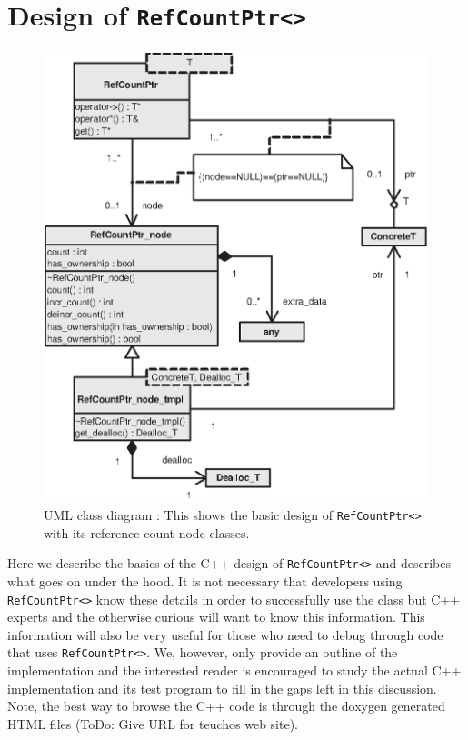 %
\section{Design of \texttt{Ref\-Count\-Ptr<>}}
\label{rcp:apdx:design}
%

{\bsinglespace
\begin{figure}
\begin{center}
\includegraphics*[bb= 0.0in 0.0in 4.5in 5.3in,scale=1.0
]{RefCountPtrClassDiagram}
\end{center}
{}\caption{ {}\label{rcp:fig:rcp-class-diagram} UML class diagram :
This shows the basic design of {}\texttt{Ref\-Count\-Ptr<>} with its
reference-count node classes.  }
\end{figure}
\esinglespace}

Here we describe the basics of the C++ design of
{}\texttt{Ref\-Count\-Ptr<>} and describes what goes on under the
hood.  It is not necessary that developers using
{}\texttt{Ref\-Count\-Ptr<>} know these details in order to
successfully use the class but C++ experts and the otherwise curious
will want to know this information.  This information will also be
very useful for those who need to debug through code that uses
{}\texttt{Ref\-Count\-Ptr<>}.  We, however, only provide an outline of
the implementation and the interested reader is encouraged to study
the actual C++ implementation and its test program to fill in the gaps
left in this discussion.  Note, the best way to browse the C++ code is
through the doxygen generated HTML files (ToDo: Give URL for teuchos
web site).

